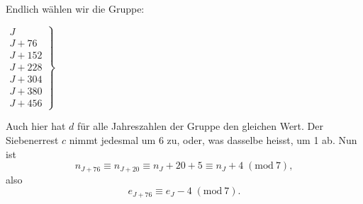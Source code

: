 Endlich wählen wir die Gruppe:
\begin{center}
$\left.\begin{array}{l}J\\J+76\\J+152\\J+228\\J+304\\J+380\\J+456\end{array}\right\}$
\begin{minipage}{.81\linewidth}Auch hier hat $d$ für alle Jahreszahlen der Gruppe den gleichen
Wert. Der Siebenerrest $c$ nimmt jedesmal um 6 zu, oder, was
dasselbe heisst, um 1 ab. Nun ist
\[
n_{J+76}\equiv n_{J+20}\equiv n_J+20+5\equiv n_J+4\; (\mathrm{mod}\ 7),
\]
\noindent also
\[
e_{J+76}\equiv e_J-4\; (\mathrm{mod}\ 7).
\]
\end{minipage}
\end{center}
\clearpage\endgroup
